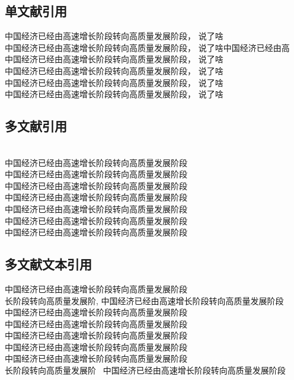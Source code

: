 \documentclass{ERJ}
\begin{document}
\subsection{单文献引用}
中国经济已经由高速增长阶段转向高质量发展阶段，\noindent \textcite{cn1} 说了啥\\
中国经济已经由高速增长阶段转向高质量发展阶段，\textcite{cn2} 说了啥中国经济已经由高\\
中国经济已经由高速增长阶段转向高质量发展阶段，\textcite{cn3} 说了啥\\
中国经济已经由高速增长阶段转向高质量发展阶段，\textcite{en1} 说了啥\\
中国经济已经由高速增长阶段转向高质量发展阶段，\textcite{en2} 说了啥\\
中国经济已经由高速增长阶段转向高质量发展阶段，\textcite{en3} 说了啥\\
\newpage

\subsection{多文献引用}
\noindent\cite{cn1,cn2}\\
中国经济已经由高速增长阶段转向高质量发展阶段\cite{cn1,cn3}\\
中国经济已经由高速增长阶段转向高质量发展阶段 \cite{cn2,cn3}\\
中国经济已经由高速增长阶段转向高质量发展阶段\cite{cn1,cn2,cn3}\\
中国经济已经由高速增长阶段转向高质量发展阶段\cite{en1,en2}\\
中国经济已经由高速增长阶段转向高质量发展阶段\cite{en1,en3}\\
中国经济已经由高速增长阶段转向高质量发展阶段\cite{en2,en3}\\
中国经济已经由高速增长阶段转向高质量发展阶段\cite{en1,en2,en3}\\

\subsection{多文献文本引用}
\noindent\textcite{cn1,cn2} 中国经济已经由高速增长阶段转向高质量发展阶段\\
长阶段转向高质量发展阶,\textcite{cn1,cn3} 中国经济已经由高速增长阶段转向高质量发展阶段\\
\textcite{cn2,cn3} 中国经济已经由高速增长阶段转向高质量发展阶段\\
\textcite{cn1,cn2,cn3} 中国经济已经由高速增长阶段转向高质量发展阶段\\
\textcite{en1,en2} 中国经济已经由高速增长阶段转向高质量发展阶段\\
\textcite{en1,en3} 中国经济已经由高速增长阶段转向高质量发展阶段\\
\textcite{en2,en3} 中国经济已经由高速增长阶段转向高质量发展阶段\\
长阶段转向高质量发展阶~\textcite{en1,en2,en3} 中国经济已经由高速增长阶段转向高质量发展阶段\\
\end{document}
